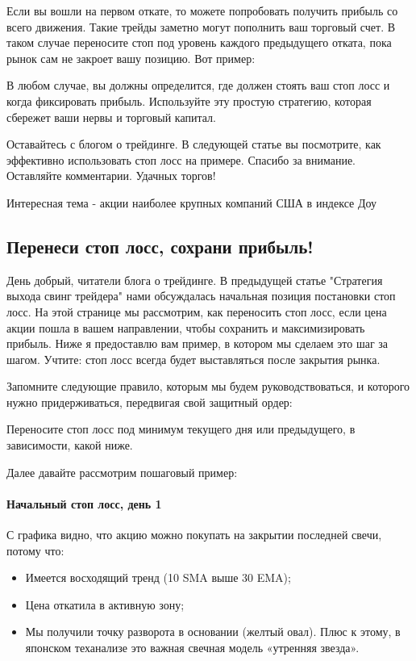 \documentclass{book}
\begin{document}
Если вы вошли на первом откате, то можете попробовать получить прибыль со всего движения. Такие трейды заметно могут пополнить ваш торговый счет. В таком случае переносите стоп под уровень каждого предыдущего отката, пока рынок сам не закроет вашу позицию. Вот пример:

В любом случае, вы должны определится, где должен стоять ваш стоп лосс и когда фиксировать прибыль. Используйте эту простую стратегию, которая сбережет ваши нервы и торговый капитал.

Оставайтесь с блогом о трейдинге. В следующей статье вы посмотрите, как эффективно использовать стоп лосс на примере. Спасибо за внимание. Оставляйте комментарии. Удачных торгов!


Интересная тема - акции наиболее крупных компаний США в индексе Доу

\subsection{Перенеси стоп лосс, сохрани прибыль!}

День добрый, читатели блога о трейдинге. В предыдущей статье "Стратегия выхода свинг трейдера" нами обсуждалась начальная позиция постановки стоп лосс. На этой странице мы рассмотрим, как переносить стоп лосс, если цена акции пошла в вашем направлении, чтобы сохранить и максимизировать прибыль. Ниже я предоставлю вам пример, в котором мы сделаем это шаг за шагом. Учтите: стоп лосс всегда будет выставляться после закрытия рынка.

Запомните следующие правило, которым мы будем руководствоваться, и которого нужно придерживаться, передвигая свой защитный ордер:

Переносите стоп лосс под минимум текущего дня или предыдущего, в зависимости, какой ниже.

Далее давайте рассмотрим пошаговый пример:

\paragraph{Начальный стоп лосс, день 1}

С графика видно, что акцию можно покупать на закрытии последней свечи, потому что:
\begin{itemize}
\item     Имеется восходящий тренд (10 SMA выше 30 EMA);
\item     Цена откатила в активную зону;
\item     Мы получили точку разворота в основании (желтый овал). Плюс к этому, в японском теханализе это важная свечная модель «утренняя звезда».
\end{itemize}
\end{document}
